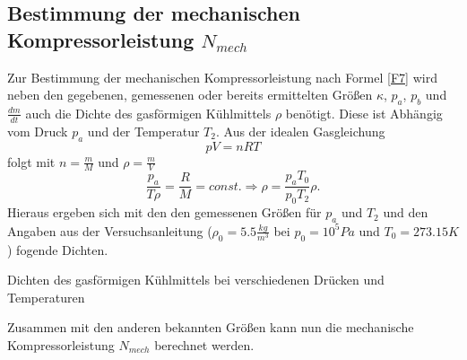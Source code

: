 \documentclass[11pt]{article}
\begin{document}
\subsection{Bestimmung der mechanischen Kompressorleistung $N_{mech}$}
Zur Bestimmung der mechanischen Kompressorleistung nach Formel \ref{F7} wird neben den gegebenen, gemessenen oder bereits ermittelten Größen $\kappa$, $p_a$, $p_b$ und $\frac{dm}{dt}$ auch die Dichte des gasförmigen Kühlmittels $\rho$ benötigt. Diese ist Abhängig vom Druck $p_a$ und der Temperatur $T_2$. Aus der idealen Gasgleichung 
\begin{equation}
pV=nRT
\end{equation}
folgt mit $n= \frac{m}{M}$ und $\rho = \frac mV$
\begin{equation}
\frac{p_a}{T \rho} = \frac{R}{M} = const. \Rightarrow \rho = \frac{p_aT_0}{p_0T_2} \rho.
\end{equation}
Hieraus ergeben sich mit den den gemessenen Größen für $p_a$ und $T_2$ und den Angaben aus der Versuchsanleitung ($\rho_0 = 5.5 \frac{kg}{m^3}$ bei $p_0  = 10^5 Pa$ und $T_0 = 273.15 K$) fogende Dichten.
\begin{table}
\caption{Dichten des gasförmigen Kühlmittels bei verschiedenen Drücken und Temperaturen}
\end{table}

\noindent
Zusammen mit den anderen bekannten Größen kann nun die mechanische Kompressorleistung $N_{mech}$ berechnet werden.
\end{document}
